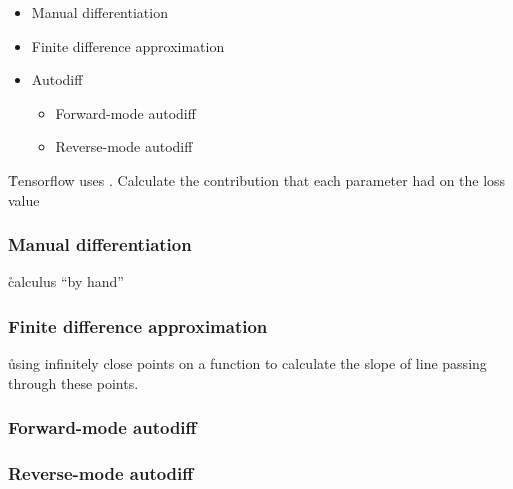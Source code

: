 
\begin{itemize}[noitemsep,topsep=0pt]
	\item Manual differentiation
	\item Finite difference approximation
	\item Autodiff
	\begin{itemize}[noitemsep,topsep=0pt]
		\item Forward-mode autodiff
		\item Reverse-mode autodiff
	\end{itemize}
\end{itemize}


\r{Tensorflow uses .  Calculate the contribution that each parameter had on the loss value}

\subsubsection{Manual differentiation}

\r{calculus ``by hand''}

\subsubsection{Finite difference approximation}

\r{using infinitely close points on a function to calculate the slope of line passing through these points.}



\subsubsection{Forward-mode autodiff}



\subsubsection{Reverse-mode autodiff}

